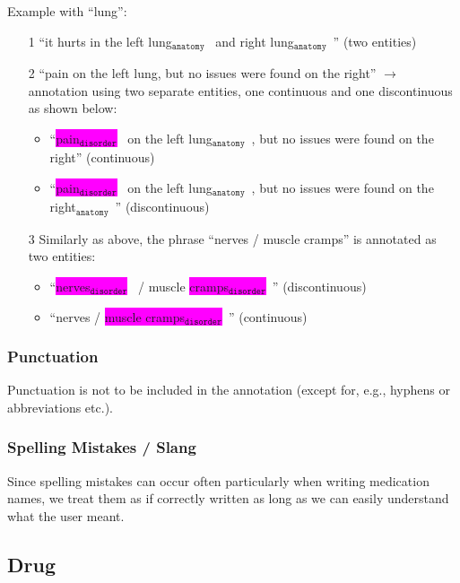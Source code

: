 \documentclass[12pt]{article}
\theoremstyle{definition}
\newcommand{\anatomy}[1]{\colorbox{dollarbill}{#1$_{\texttt{anatomy}}$}\ }
\newcommand{\disorder}[1]{\colorbox{fuchsia}{#1$_{\texttt{disorder}}$}\ }
\begin{document}
Example with ``lung'':
\begin{enumerate}
    \item[1] ``it hurts in the \anatomy{left lung} and \anatomy{right lung}'' (two entities)
    
    \item[2] ``pain on the left lung, but no issues were found on the right'' $\rightarrow$ annotation using two separate entities, one continuous and one discontinuous as shown below:
    \begin{itemize}
        \item ``\disorder{pain} on the \anatomy{left lung}, but no issues were found on the right'' (continuous)
        \item ``\disorder{pain} on the left \anatomy{lung}, but no issues were found on the \anatomy{right}'' (discontinuous) 
    \end{itemize}

    \item[3] Similarly as above, the phrase ``nerves / muscle cramps'' is annotated as two entities:
    \begin{itemize}
        \item ``\disorder{nerves} / muscle \disorder{cramps}'' (discontinuous)
        \item ``nerves / \disorder{muscle cramps}'' (continuous)
    \end{itemize}


\end{enumerate}



\subsubsection*{Punctuation}

Punctuation is not to be included in the annotation (except for, e.g., hyphens or abbreviations etc.).

\subsubsection*{Spelling Mistakes / Slang}

Since spelling mistakes can occur often particularly when writing medication names, we treat them as if correctly written as long as we can easily understand what the user meant.

\subsection{Drug}\label{ent_drug}
\end{document}
